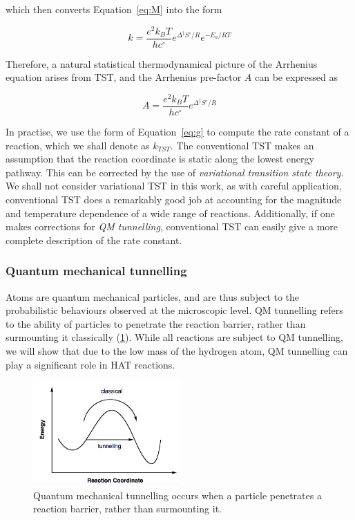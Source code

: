\begin{doublespace}
\noindent which then converts Equation~\ref{eq:M} into the form

\begin{equation}
  k = \frac{e^2k_B T}{hc^\circ}e^{\Delta^\ddagger S^\circ/R}e^{-E_a/RT}
\end{equation}

Therefore, a natural statistical thermodynamical picture of the Arrhenius
equation arises from TST, and the Arrhenius pre-factor $A$ can be expressed as

\begin{equation}
  A = \frac{e^2k_B T}{hc^\circ}e^{\Delta^\ddagger S^\circ/R}
\label{eq:afactor}
\end{equation}

In practise, we use the form of Equation~\ref{eq:g} to compute the rate
constant of a reaction, which we shall denote as $k_{TST}$. The conventional
TST makes an assumption that the reaction coordinate is static along the lowest
energy pathway. This can be corrected by the use of \emph{variational
transition state theory}.\cite{Truhlar1984} We shall not consider variational
TST in this work, as with careful application, conventional TST does a
remarkably good job at accounting for the magnitude and temperature dependence
of a wide range of reactions.\cite{Steinfeld1998} Additionally, if one makes
corrections for \emph{QM tunnelling}, conventional TST can easily give a more
complete description of the rate constant.

\subsubsection{Quantum mechanical tunnelling}

Atoms are quantum mechanical particles, and are thus subject to the
probabilistic behaviours observed at the microscopic level. QM tunnelling refers
to the ability of particles to penetrate the reaction barrier, rather than
surmounting it classically (\ref{fig:tunnelling}). While all reactions are
subject to QM tunnelling, we will show that due to the low mass of the hydrogen
atom, QM tunnelling can play a significant role in HAT reactions.

\begin{figure}[htb]
  \centering
  \includegraphics[width=0.5\textwidth]{figures/tunnelling-1}
  \caption{Quantum mechanical tunnelling occurs when a particle penetrates a
    reaction barrier, rather than surmounting it.}
\label{fig:tunnelling}
\end{figure}



\end{doublespace}
